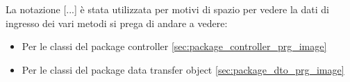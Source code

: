 La notazione [...] è stata utilizzata per motivi di spazio per vedere la dati di ingresso dei vari metodi si prega di andare a vedere:
\begin{itemize}
    \item Per le classi del package controller \ref{sec:package_controller_prg_image}
    \item Per le classi del package data transfer object \ref{sec:package_dto_prg_image}
\end{itemize}

